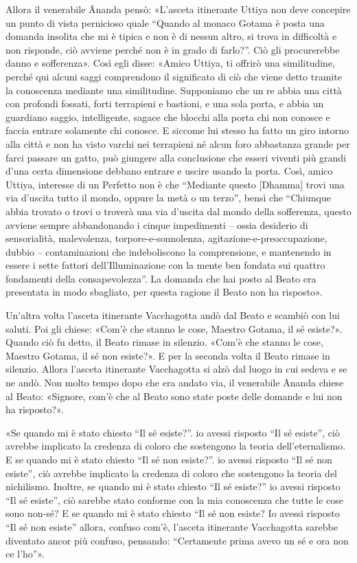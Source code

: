 Allora il venerabile Ānanda pensò: «L’asceta itinerante Uttiya non deve
concepire un punto di vista pernicioso quale “Quando al monaco Gotama è
posta una domanda insolita che mi è tipica e non è di nessun altro, si
trova in difficoltà e non risponde, ciò avviene perché non è in grado di
farlo?”. Ciò gli procurerebbe danno e sofferenza». Così egli disse:
«Amico Uttiya, ti offrirò una similitudine, perché qui alcuni saggi
comprendono il significato di ciò che viene detto tramite la conoscenza
mediante una similitudine. Supponiamo che un re abbia una città con
profondi fossati, forti terrapieni e bastioni, e una sola porta, e abbia
un guardiano saggio, intelligente, sagace che blocchi alla porta chi non
conosce e faccia entrare solamente chi conosce. E siccome lui stesso ha
fatto un giro intorno alla città e non ha visto varchi nei terrapieni né
alcun foro abbastanza grande per farci passare un gatto, può giungere
alla conclusione che esseri viventi più grandi d’una certa dimensione
debbano entrare e uscire usando la porta. Così, amico Uttiya, interesse
di un Perfetto non è che “Mediante questo [Dhamma] trovi una via
d’uscita tutto il mondo, oppure la metà o un terzo”, bensì che “Chiunque
abbia trovato o trovi o troverà una via d’uscita dal mondo della
sofferenza, questo avviene sempre abbandonando i cinque impedimenti –
ossia desiderio di sensorialità, malevolenza, torpore-e-sonnolenza,
agitazione-e-preoccupazione, dubbio – contaminazioni che indeboliscono
la comprensione, e mantenendo in essere i sette fattori
dell’Illuminazione con la mente ben fondata sui quattro fondamenti della
consapevolezza”. La domanda che hai posto al Beato era presentata in
modo sbagliato, per questa ragione il Beato non ha risposto».




Un’altra volta l’asceta itinerante Vacchagotta andò dal Beato e scambiò
con lui saluti. Poi gli chiese: «Com’è che stanno le cose, Maestro
Gotama, il sé esiste?». Quando ciò fu detto, il Beato rimase in
silenzio. «Com’è che stanno le cose, Maestro Gotama, il sé non esiste?».
E per la seconda volta il Beato rimase in silenzio. Allora l’asceta
itinerante Vacchagotta si alzò dal luogo in cui sedeva e se ne andò. Non
molto tempo dopo che era andato via, il venerabile Ānanda chiese al
Beato: «Signore, com’è che al Beato sono state poste delle domande e lui
non ha risposto?».


«Se quando mi è stato chiesto “Il sé esiste?”. io avessi risposto “Il sé
esiste”, ciò avrebbe implicato la credenza di coloro che sostengono la
teoria dell’eternalismo. E se quando mi è stato chiesto “Il sé non
esiste?”. io avessi risposto “Il sé non esiste”, ciò avrebbe implicato
la credenza di coloro che sostengono la teoria del nichilismo. Inoltre,
se quando mi è stato chiesto “Il sé esiste?” io avessi risposto “Il sé
esiste”, ciò sarebbe stato conforme con la mia conoscenza che tutte le
cose sono non-sé? E se quando mi è stato chiesto “Il sé non esiste? Io
avessi risposto “Il sé non esiste” allora, confuso com’è, l’asceta
itinerante Vacchagotta sarebbe diventato ancor più confuso, pensando:
“Certamente prima avevo un sé e ora non ce l’ho”».


